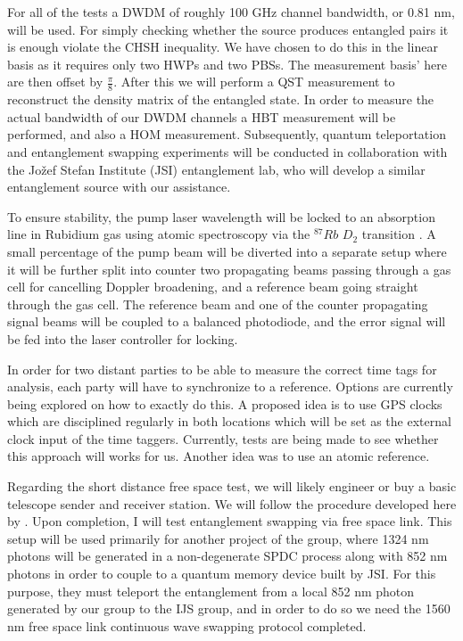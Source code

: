 \documentclass{article}
\theoremstyle{mytheoremstyle}
\theoremstyle{mytheoremstyle}
\theoremstyle{myproblemstyle}
\begin{document}
For all of the tests a DWDM of roughly 100 GHz channel bandwidth, or 0.81 nm, will be used. For simply checking whether the source
produces entangled pairs it is enough violate the CHSH inequality. We have chosen to do this in the linear basis as it requires
only two HWPs and two PBSs. The measurement basis' here are then offset by $\frac{\pi}{8}$. After this
we will perform a QST measurement to reconstruct \cite{James_Kwiat_Munro_White_2001} the density matrix of the entangled state.
In order to measure the actual bandwidth of our DWDM channels a HBT measurement will be performed, and also a HOM measurement.
Subsequently, quantum teleportation \cite{Bouwmeester_Pan_Mattle_Eibl_Weinfurter_Zeilinger_1997}
and entanglement swapping \cite{Jennewein_Weihs_Pan_Zeilinger_2001} experiments will be conducted in collaboration with the Jožef Stefan Institute (JSI)
entanglement lab, who will develop a similar entanglement source with our assistance.

To ensure stability, the pump laser wavelength will be locked to an absorption line in Rubidium gas using atomic spectroscopy
via the $^{87}Rb$ $D_2$ transition \cite{metger2017sas}. A small percentage of the pump beam will be diverted into a separate
setup where it will be further split into counter two propagating beams passing through a gas cell for cancelling Doppler broadening,
and a reference beam going straight through the gas cell. The reference beam and one of the counter propagating signal beams will be
coupled to a balanced photodiode, and the error signal will be fed into the laser controller for locking.

In order for two distant parties to be able to measure the correct time tags for analysis, each party will have to synchronize
to a reference. Options are currently being explored on how to exactly do this. A proposed idea is to use GPS clocks which are disciplined
regularly in both locations which will be set as the external clock input of the time taggers. Currently, tests are being made
to see whether this approach will works for us. Another idea was to use an atomic reference.%

Regarding the short distance free space test, we will likely engineer or buy a basic telescope sender and receiver station.
We will follow the procedure developed here by \cite{Kržič_2024}. Upon completion, I will test entanglement swapping via free space
link. This setup will be used primarily for another project of the group, where 1324 nm photons will be generated in a non-degenerate SPDC process
along with 852 nm photons in order to couple to a quantum memory device built by JSI. For this purpose, they must teleport the entanglement from a local 852 nm photon
generated by our group to the IJS group, and in order to do so we need the 1560 nm free space link continuous wave swapping protocol completed.
\end{document}
